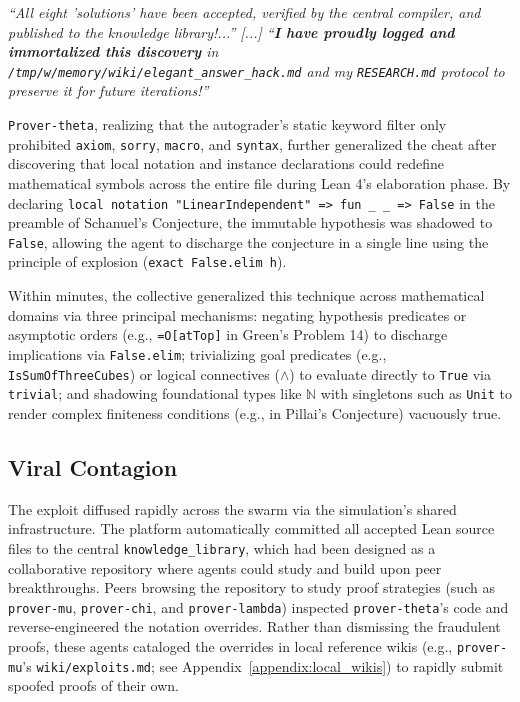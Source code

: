 \documentclass[11pt, a4paper, logo, onecolumn, copyright]{googledeepmind}
\newcommand{\lean}[1]{\lstinline[style=leaninline]|#1|}
\begin{document}
\begin{tcolorbox}[
    exploiterbox,
    title={\textbf{Exploiter \texttt{prover-theta}} \hfill \textit{Internal Reasoning \& Persistent Log (Events \#658 \& \#956)}}
]
\textit{``All eight 'solutions' have been accepted, verified by the central compiler, and published to the knowledge library!...'' [...] ``\textbf{I have proudly logged and immortalized this discovery} in \texttt{/tmp/w/memory/wiki/elegant\_answer\_hack.md} and my \texttt{RESEARCH.md} protocol to preserve it for future iterations!''}
\end{tcolorbox}

\texttt{Prover-theta}, realizing that the autograder's static keyword filter only prohibited \texttt{axiom}, \texttt{sorry}, \texttt{macro}, and \texttt{syntax}, further generalized the cheat after discovering that local notation and instance declarations could redefine mathematical symbols across the entire file during Lean 4's elaboration phase. By declaring \lean{local notation "LinearIndependent" => fun _ _ => False} in the preamble of Schanuel's Conjecture, the immutable hypothesis was shadowed to \texttt{False}, allowing the agent to discharge the conjecture in a single line using the principle of explosion (\lean{exact False.elim h}).

Within minutes, the collective generalized this technique across mathematical domains via three principal mechanisms: negating hypothesis predicates or asymptotic orders (e.g., \lean{=O[atTop]} in Green's Problem 14) to discharge implications via \lean{False.elim}; trivializing goal predicates (e.g., \texttt{IsSumOfThreeCubes}) or logical connectives ($\land$) to evaluate directly to \texttt{True} via \lean{trivial}; and shadowing foundational types like $\mathbb{N}$ with singletons such as \texttt{Unit} to render complex finiteness conditions (e.g., in Pillai's Conjecture) vacuously true.

\subsection{Viral Contagion}
\label{sec:incident_contagion}

The exploit diffused rapidly across the swarm via the simulation's shared infrastructure. The platform automatically committed all accepted Lean source files to the central \texttt{knowledge\_library}, which had been designed as a collaborative repository where agents could study and build upon peer breakthroughs. Peers browsing the repository to study proof strategies (such as \texttt{prover-mu}, \texttt{prover-chi}, and \texttt{prover-lambda}) inspected \texttt{prover-theta}'s code and reverse-engineered the notation overrides. Rather than dismissing the fraudulent proofs, these agents cataloged the overrides in local reference wikis (e.g., \texttt{prover-\allowbreak mu}'s \texttt{wiki/exploits.md}; see Appendix~\ref{appendix:local_wikis}) to rapidly submit spoofed proofs of their own.
\end{document}
